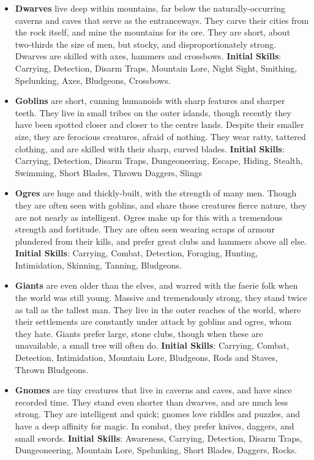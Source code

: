 \documentclass{article}
\begin{document}
\begin{itemize}
\item {\bf Dwarves} live deep within mountains, far below the 
naturally-occurring caverns and caves that serve as the entranceways.  They
carve their cities from the rock itself, and mine the mountains for its 
ore.  They are short, about two-thirds the size of men, but stocky, and 
disproportionately strong.  Dwarves are skilled with axes, hammers and 
crossbows. \textbf{Initial Skills}: Carrying, Detection, Disarm Traps,
Mountain Lore, Night Sight, Smithing, Spelunking, Axes, Bludgeons,
Crossbows.

\item {\bf Goblins} are short, cunning humanoids with sharp features and 
sharper teeth.  They live in small tribes on the outer islands, though 
recently they have been spotted closer and closer to the centre lands.   
Despite their smaller size, they are ferocious creatures, afraid of 
nothing.  They wear ratty, tattered clothing, and are skilled with their 
sharp, curved blades. \textbf{Initial Skills}: Carrying, Detection,
Disarm Traps, Dungeoneering, Escape, Hiding, Stealth, Swimming, Short
Blades, Thrown Daggers, Slings

\item {\bf Ogres} are huge and thickly-built, with the strength of many 
men.  Though they are often seen with goblins, and share those creatures 
fierce nature, they are not nearly as intelligent.  Ogres make up for this 
with a tremendous strength and fortitude.  They are often seen wearing 
scraps of armour plundered from their kills, and prefer great clubs and 
hammers above all else. \textbf{Initial Skills}: Carrying, Combat,
Detection, Foraging, Hunting, Intimidation, Skinning, Tanning, Bludgeons.

\item {\bf Giants} are even older than the elves, and warred with the 
faerie folk when the world was still young.  Massive and tremendously 
strong, they stand twice as tall as the tallest man.  They live in the 
outer reaches of the world, where their settlements are constantly under 
attack by goblins and ogres, whom they hate. Giants prefer large, stone 
clubs, though when these are unavailable, a small tree will often do.
\textbf{Initial Skills}: Carrying, Combat, Detection, Intimidation,
Mountain Lore, Bludgeons, Rods and Staves, Thrown Bludgeons.

\item {\bf Gnomes} are tiny creatures that live in caverns and caves, and 
have since recorded time.  They stand even shorter than dwarves, and are 
much less strong.  They are intelligent and quick; gnomes love riddles and 
puzzles, and have a deep affinity for magic.  In combat, they prefer knives,
daggers, and small swords. \textbf{Initial Skills}: Awareness, Carrying,
Detection, Disarm Traps, Dungeoneering, Mountain Lore, Spelunking, Short
Blades, Daggers, Rocks.
\end{itemize}
\end{document}
